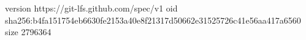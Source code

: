 version https://git-lfs.github.com/spec/v1
oid sha256:b4fa151754eb6630fe2153a40e8f21317d50662e31525726c41e56aa417a6560
size 2796364
